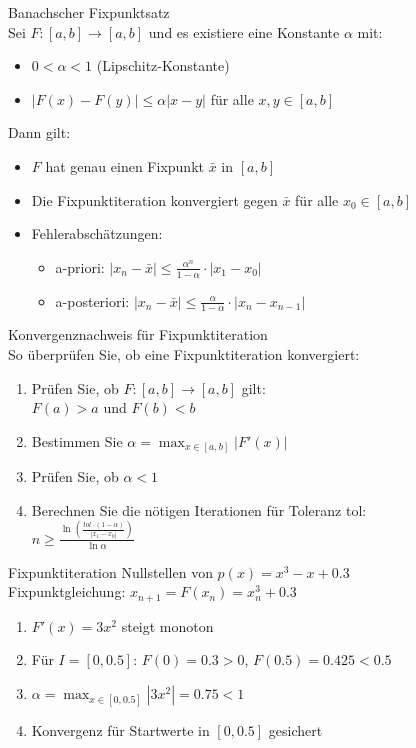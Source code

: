 \begin{lemma}{Banachscher Fixpunktsatz}\\
Sei $F:[a,b] \rightarrow [a,b]$ und es existiere eine Konstante $\alpha$ mit:
\begin{itemize}
    \item $0 < \alpha < 1$ (Lipschitz-Konstante)
    \item $|F(x)-F(y)| \leq \alpha|x-y|$ für alle $x,y \in [a,b]$
\end{itemize}

Dann gilt:
\begin{itemize}
    \item $F$ hat genau einen Fixpunkt $\bar{x}$ in $[a,b]$
    \item Die Fixpunktiteration konvergiert gegen $\bar{x}$ für alle $x_0 \in [a,b]$
    \item Fehlerabschätzungen:
    \begin{itemize}
        \item a-priori: $|x_n-\bar{x}| \leq \frac{\alpha^n}{1-\alpha} \cdot |x_1-x_0|$
        \item a-posteriori: $|x_n-\bar{x}| \leq \frac{\alpha}{1-\alpha} \cdot |x_n-x_{n-1}|$
    \end{itemize}
\end{itemize}
\end{lemma}

\begin{KR}{Konvergenznachweis für Fixpunktiteration}\\
So überprüfen Sie, ob eine Fixpunktiteration konvergiert:
\begin{enumerate}
    \item Prüfen Sie, ob $F:[a,b] \rightarrow [a,b]$ gilt:\\
           $F(a) > a$ und $F(b) < b$
    \item Bestimmen Sie $\alpha = \max_{x \in [a,b]} |F'(x)|$
    \item Prüfen Sie, ob $\alpha < 1$
    \item Berechnen Sie die nötigen Iterationen für Toleranz tol:\\
           $n \geq \frac{\ln(\frac{tol \cdot (1-\alpha)}{|x_1-x_0|})}{\ln \alpha}$
\end{enumerate}
\end{KR}

\begin{example2}{Fixpunktiteration} Nullstellen von $p(x)=x^3-x+0.3$\\
Fixpunktgleichung: $x_{n+1} = F(x_n) = x_n^3 + 0.3$
\begin{enumerate}
    \item $F'(x) = 3x^2$ steigt monoton
    \item Für $I=[0,0.5]$: $F(0)=0.3 > 0$, $F(0.5)=0.425 < 0.5$
    \item $\alpha = \max_{x \in [0,0.5]} |3x^2| = 0.75 < 1$
    \item Konvergenz für Startwerte in $[0,0.5]$ gesichert
\end{enumerate}
\end{example2}

